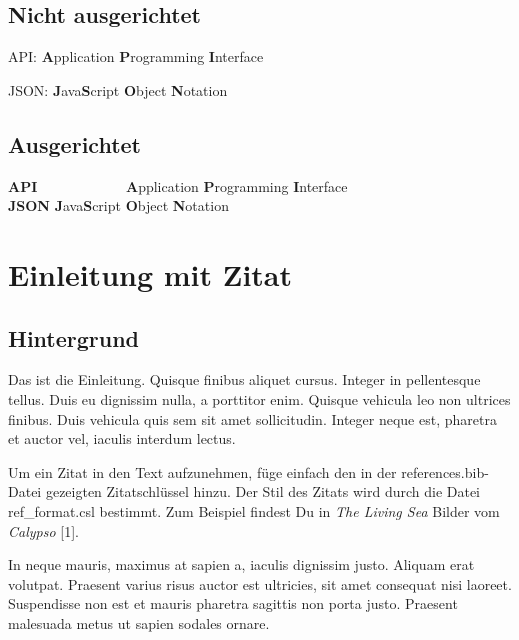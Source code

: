 \documentclass[listof=totoc,index=totoc,bibliography=totoc,12pt,german,a4paper,]{report}
\begin{document}
\section*{Nicht ausgerichtet}\label{nicht-ausgerichtet}

API: \textbf{A}pplication \textbf{P}rogramming \textbf{I}nterface

JSON: \textbf{J}ava\textbf{S}cript \textbf{O}bject \textbf{N}otation

\section*{Ausgerichtet}\label{ausgerichtet}

\begin{tabbing}
\textbf{API}~~~~~~~~~~~~ \= \textbf{A}pplication \textbf{P}rogramming \textbf{I}nterface \\  
\textbf{JSON} \> \textbf{J}ava\textbf{S}cript \textbf{O}bject \textbf{N}otation \\  
\end{tabbing}

\newpage

\setcounter{page}{1}
\doublespacing
\setlength{\parindent}{0.5in}

\chapter{Einleitung mit Zitat}\label{sec:intro}

\section{Hintergrund}\label{hintergrund}

Das ist die Einleitung. Quisque finibus aliquet cursus. Integer in
pellentesque tellus. Duis eu dignissim nulla, a porttitor enim. Quisque
vehicula leo non ultrices finibus. Duis vehicula quis sem sit amet
sollicitudin. Integer neque est, pharetra et auctor vel, iaculis
interdum lectus.

Um ein Zitat in den Text aufzunehmen, füge einfach den in der
references.bib-Datei gezeigten Zitatschlüssel hinzu. Der Stil des Zitats
wird durch die Datei ref\_format.csl bestimmt. Zum Beispiel findest Du
in \emph{The Living Sea} Bilder vom \emph{Calypso} {[}1{]}.

In neque mauris, maximus at sapien a, iaculis dignissim justo. Aliquam
erat volutpat. Praesent varius risus auctor est ultricies, sit amet
consequat nisi laoreet. Suspendisse non est et mauris pharetra sagittis
non porta justo. Praesent malesuada metus ut sapien sodales ornare.
\end{document}
